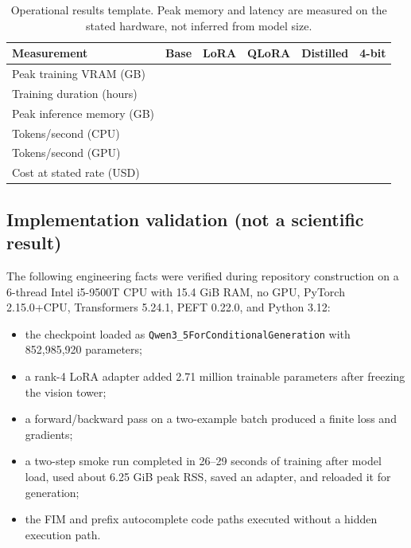 \begin{table}[t]
\centering
\small
\caption{Operational results template. Peak memory and latency are measured on
the stated hardware, not inferred from model size.}
\label{tab:results-ops}
\begin{tabular}{@{}lrrrrr@{}}
\toprule
Measurement & Base & LoRA & QLoRA & Distilled & 4-bit \\
\midrule
Peak training VRAM (GB) & \pending{} & \pending{} & \pending{} & \pending{} & \pending{} \\
Training duration (hours) & \pending{} & \pending{} & \pending{} & \pending{} & \pending{} \\
Peak inference memory (GB) & \pending{} & \pending{} & \pending{} & \pending{} & \pending{} \\
Tokens/second (CPU) & \pending{} & \pending{} & \pending{} & \pending{} & \pending{} \\
Tokens/second (GPU) & \pending{} & \pending{} & \pending{} & \pending{} & \pending{} \\
Cost at stated rate (USD) & \pending{} & \pending{} & \pending{} & \pending{} & \pending{} \\
\bottomrule
\end{tabular}
\end{table}

\subsection{Implementation validation (not a scientific result)}

The following engineering facts were verified during repository construction on a
6-thread Intel i5-9500T CPU with 15.4 GiB RAM, no GPU, PyTorch 2.15.0+CPU,
Transformers 5.24.1, PEFT 0.22.0, and Python 3.12:

\begin{itemize}[leftmargin=1.4em]
  \item the checkpoint loaded as \texttt{Qwen3\_5ForConditionalGeneration} with
  852,985,920 parameters;
  \item a rank-4 LoRA adapter added 2.71 million trainable parameters after
  freezing the vision tower;
  \item a forward/backward pass on a two-example batch produced a finite loss and
  gradients;
  \item a two-step smoke run completed in 26--29 seconds of training after model
  load, used about 6.25 GiB peak RSS, saved an adapter, and reloaded it for
  generation;
  \item the FIM and prefix autocomplete code paths executed without a hidden
  execution path.
\end{itemize}

